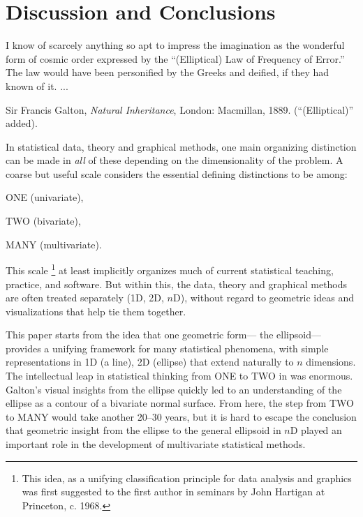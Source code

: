 \section{Discussion and Conclusions}

\epigraph{I know of scarcely anything so apt to impress the imagination as the
wonderful form of cosmic order expressed by the ``(Elliptical) Law of Frequency of
Error.'' 
The law would have been personified by the Greeks and deified, if they had known of it. 
... %
}
{Sir Francis Galton, \emph{Natural Inheritance}, London: Macmillan, 1889.
(``(Elliptical)'' added).
}

In statistical data, theory and graphical methods, one main organizing
distinction can be made in \emph{all} 
of these depending
on the dimensionality of the problem.  A coarse but useful scale considers the essential defining
distinctions to be among:
\begin{itemize*}
 \item ONE (univariate), 
 \item TWO (bivariate), 
 \item MANY (multivariate).  
\end{itemize*}
This scale%
\footnote{
This idea, as a unifying classification principle for data analysis and graphics
was first suggested to the first author in
seminars by John Hartigan at Princeton, c. 1968.
}
at least implicitly organizes much of current statistical teaching, practice, and software.
But within this, the data, theory and graphical methods are often treated separately (1D, 2D, $n$D),
without regard to geometric ideas and visualizations that help tie them together.

This paper starts from the idea that one geometric form--- the ellipsoid---
provides a unifying framework for many statistical phenomena, with simple representations in
1D (a line), 2D (ellipse) that extend naturally to $n$ dimensions.  The intellectual leap 
in statistical thinking from ONE to TWO in \citet{Galton:1886} was enormous.
Galton's visual insights from the ellipse quickly led to an understanding of the
ellipse as a contour of a bivariate normal surface.  From here, the step from TWO to MANY
would take another 20--30 years, but it is hard to escape the conclusion that 
geometric insight from the ellipse to the general ellipsoid in $n$D
played an important role in the development of multivariate statistical methods.

